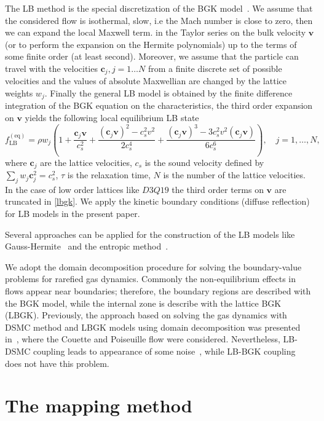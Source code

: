 \documentclass[]{elsarticle} %
\newcommand{\bv}{\boldsymbol{v}}
\newcommand{\bc}{\boldsymbol{c}}
\newcommand{\equil}[1]{#1^\mathrm{(eq)}}
\begin{document}
{The LB method is the special discretization of the BGK model~\cite{Succi2001}.
We assume that the considered flow is isothermal, slow, i.e the Mach number is close to zero, then we can expand the local Maxwell term.
in the Taylor series on the bulk velocity $\bv$ (or to perform the expansion on the Hermite polynomials) up to the terms of some finite order (at least second). Moreover, we assume that the particle can travel with the velocities $\bc_{j}, j=1 \ldots N$ from a finite discrete set of possible velocities and the values of absolute Maxwellian are changed by the lattice weights $w_j$.
Finally the general LB model is obtained by the finite difference integration of the BGK equation on the characteristics,
the third order expansion on $\bv$ yields the following local equilibrium LB state
\begin{equation}\label{lbgk}
    \equil{f}_\mathrm{LB} = \rho w_j\left(1+ \frac{\bc_j\bv}{c_s^2}+\frac{(\bc_j\bv)^2-c_s^2v^2}{2c_s^4}
    + \frac{(\bc_j\bv)^3-3c_s^2 v^2(\bc_j\bv)}{6c_s^6}\right), \quad j=1,\ldots,N,
\end{equation}
where $\bc_j$ are the lattice velocities, $c_s$ is the sound velocity defined by $\sum_jw_j\bc^2_j=c_s^2$,
$\tau$ is the relaxation time, $N$ is the number of the lattice velocities. In the case  of   low order lattices  like $D3Q19$   the  third order terms  on $\bv$ are truncated in \eqref{lbgk}.
We apply the kinetic boundary conditions (diffuse reflection)~\cite{Ansumali2002} for LB models in the present paper.

Several approaches can be applied for the construction of the LB models like Gauss-Hermite~\cite{He1997, Shan1998, Shan2006, Shan2010}
and the entropic method~\cite{Karlin1999, Chikatamarla2006, Chikatamarla2009}.

We adopt the domain decomposition procedure for solving the boundary-value problems for rarefied gas dynamics.
Commonly the non-equilibrium effects in flows appear near boundaries;
therefore, the boundary regions are described with the BGK model, while the internal zone is describe with the lattice BGK (LBGK).
Previously, the approach based on solving the gas dynamics with DSMC method and LBGK models using domain decomposition
was presented in~\cite{Staso2016short, Staso2016long, Staso2018}, where the Couette and Poiseuille flow were considered.
Nevertheless, LB-DSMC coupling leads to appearance of some noise~\cite{Succi2016}, while LB-BGK coupling does not have this problem.

\section{The mapping method}\label{sec:mapping}

}
\end{document}
